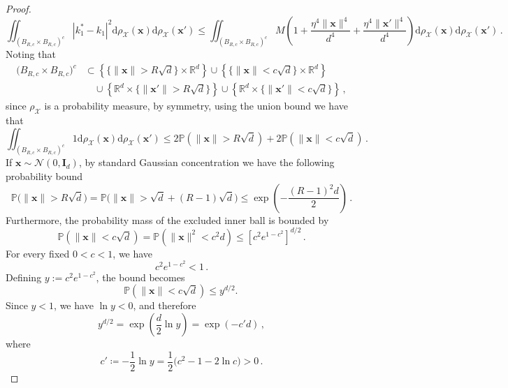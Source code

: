 \begin{proof}
    \[
        \iint_{(B_{R, c}\times B_{R, c})^c}|k_1^* - k_1|^2 \mathrm d \rho_{\mathcal X}(\bm x)\mathrm d \rho_{\mathcal X}(\bm x') \leq \iint_{(B_{R, c}\times B_{R, c})^c} M \left(1 +  \frac{\eta^4\|\bm x\|^4}{d^4} +  \frac{\eta^4\|\bm x'\|^4}{d^4}\right)  \mathrm d \rho_{\mathcal X}(\bm x)\mathrm d \rho_{\mathcal X}(\bm x') \, .
    \]
    Noting that
    \begin{align*}
        \Big( B_{R,c} \times B_{R,c}\Big)^c &\subset \left\{\Big\{\|\bm x\| > R \sqrt d\Big\} \times \mathbb R^d\right\} \cup \left\{\Big\{\|\bm x\| < c \sqrt d\Big\} \times \mathbb R^d\right\} \\
        & \quad \cup \left\{\mathbb R^d \times \Big\{\|\bm x'\| > R \sqrt d\Big\}\right\} \cup \left\{\mathbb R^d \times \Big\{\|\bm x'\| < c \sqrt d\Big\}\right\}\, ,
    \end{align*}
    since $\rho_{\mathcal X}$ is a probability measure, by symmetry, using the union bound we have that
    \[
        \iint_{(B_{R, c}\times B_{R, c})^c} 1\mathrm d \rho_{\mathcal X}(\bm x)\mathrm d \rho_{\mathcal X}(\bm x') \leq 2\mathbb P\left(\|\bm x\| > R\sqrt {d}\right) + 2\mathbb P\left(\|\bm x\| < c\sqrt {d}\right)\, .
    \]
    If $\bm x \sim \mathcal{N}(0, \bm I_d)$, by standard Gaussian concentration we have the following probability bound
    \[
        \mathbb{P}\Big(\|\bm x\| > R\sqrt{d}\Big) = \mathbb{P}\Big(\|\bm x\| > \sqrt{d} + (R-1)\sqrt{d}\Big) \leq \exp\left(-\frac{(R-1)^2 d}{2}\right)\,.
    \]
    Furthermore, the probability mass of the excluded inner ball is bounded by
    \[
        \mathbb{P}(\|\bm x\| < c\sqrt{d}) = \mathbb{P}(\|\bm x\|^2 < c^2 d) \le \left[c^2 e^{1-c^2}\right]^{d/2}\, .
    \]
    For every fixed $0<c<1$, we have
    \[
        c^2 e^{1-c^2}<1\, .
    \]
    Defining $y := c^2 e^{1-c^2}$, the bound becomes
    \[
        \mathbb P(\|\bm x\|<c\sqrt d) \leq  y^{d/2}.\, 
    \]
    Since $y <1$, we have $\ln y<0$, and therefore
    \[
        y^{d/2} = \exp\!\left(\frac {d}{2} \ln y\right) = \exp(-c'd)\, ,
    \]
    where
    \[
        c' \coloneqq -\frac12\ln y = \frac12\bigl(c^2-1-2\ln c \bigr) >0\, .
    \]


\end{proof}
